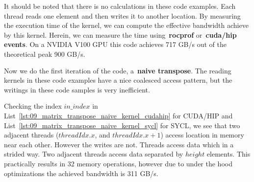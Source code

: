 





\par
It should be noted that there is no calculations in these code examples.
Each thread reads one element and then writes it to another location.
By measuring the execution time of the kernel, we can compute the effective bandwidth achieve by this kernel.
Herein, we can measure the time using~\textbf{rocprof} or~\textbf{cuda/hip events}.
On a NVIDIA V100 GPU this code achieves 717 GB/s out of the theoretical peak 900 GB/s.


\par
Now we do the first iteration of the code, a~\textbf{naive transpose}.
The reading kernels in these code examples have a nice coalesced access pattern, but the writings in these code samples is very inefficient.


\par
Checking the index $in\_index$ in List~\ref{lst:09_matrix_transpose_naive_kernel_cudahip} for CUDA/HIP and List~\ref{lst:09_matrix_transpose_naive_kernel_sycl} for SYCL, we see that two adjacent threads ($threadIdx.x$, and $threadIdx.x+1$) access location in memory near each other.
However the writes are not.
Threads access data which in a strided way.
Two adjacent threads access data separated by $height$ elements.
This practically results in 32 memory operations, however due to under the hood optimizations the achieved bandwidth is 311 GB/s.







